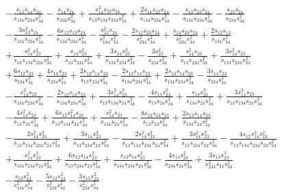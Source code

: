 \begin{align}
        & - \frac{s_{13}s_{14}s_{24}}{s_{134}s_{234}s_{34}^2} - \frac{s_{14}s_{24}}{s_{234}s_{34}^2} + \frac{s_{14}^2s_{23}s_{24}}{s_{13}s_{134}s_{234}s_{34}^2} + \frac{2s_{14}s_{23}s_{24}}{s_{134}s_{234}s_{34}^2} - \frac{s_{13}s_{23}s_{24}}{s_{134}s_{234}s_{34}^2} - \frac{s_{23}s_{24}}{s_{234}s_{34}^2} \nonumber \\
        & - \frac{3s_{13}^2s_{24}}{s_{134}s_{234}s_{34}^2} - \frac{6s_{12}s_{13}s_{24}}{s_{134}s_{234}s_{34}^2} - \frac{s_{13}^2s_{24}}{s_{134}^2s_{34}^2} - \frac{2s_{12}s_{23}s_{24}}{s_{234}^2s_{34}^2} + \frac{s_{14}s_{23}s_{24}}{s_{234}^2s_{34}^2} + \frac{2s_{12}s_{13}}{s_{134}s_{34}^2} \nonumber \\
        & + \frac{s_{14}^2s_{23}^2}{s_{13}s_{134}s_{234}s_{34}^2} + \frac{s_{14}s_{23}^2}{s_{13}s_{234}s_{34}^2} + \frac{3s_{14}s_{23}^2}{s_{134}s_{234}s_{34}^2} - \frac{3s_{23}^2}{s_{234}s_{34}^2} + \frac{s_{14}^2s_{23}}{s_{13}s_{234}s_{34}^2} + \frac{3s_{14}^2s_{23}}{s_{134}s_{234}s_{34}^2} \nonumber \\
        & + \frac{6s_{12}s_{23}}{s_{234}s_{34}^2} + \frac{4s_{13}s_{23}}{s_{234}s_{34}^2} + \frac{2s_{12}s_{14}s_{23}}{s_{13}s_{234}s_{34}^2} - \frac{2s_{12}s_{14}s_{23}}{s_{134}s_{234}s_{34}^2} + \frac{2s_{13}s_{14}s_{23}}{s_{134}s_{234}s_{34}^2} - \frac{3s_{14}s_{23}}{s_{234}s_{34}^2} \nonumber \\
        & - \frac{s_{13}^2s_{23}}{s_{134}s_{234}s_{34}^2} - \frac{2s_{12}s_{13}s_{23}}{s_{134}s_{234}s_{34}^2} + \frac{3s_{14}^2s_{23}^2}{s_{13}s_{134}s_{24}s_{34}^2} - \frac{4s_{14}s_{23}^2}{s_{13}s_{24}s_{34}^2} + \frac{s_{14}s_{23}^2}{s_{134}s_{24}s_{34}^2} + \frac{3s_{14}^3s_{23}}{s_{13}s_{134}s_{24}s_{34}^2} \nonumber \\
        & - \frac{4s_{14}^2s_{23}}{s_{13}s_{24}s_{34}^2} + \frac{6s_{12}s_{14}^2s_{23}}{s_{13}s_{134}s_{24}s_{34}^2} + \frac{s_{14}^2s_{23}}{s_{134}s_{24}s_{34}^2} - \frac{8s_{12}s_{14}s_{23}}{s_{13}s_{24}s_{34}^2} + \frac{2s_{12}s_{14}s_{23}}{s_{134}s_{24}s_{34}^2} \nonumber \\
        & - \frac{2s_{14}^2s_{23}^3}{s_{13}s_{134}s_{234}s_{24}s_{34}^2} + \frac{3s_{14}s_{23}^3}{s_{13}s_{234}s_{24}s_{34}^2} - \frac{2s_{14}^3s_{23}^2}{s_{13}s_{134}s_{234}s_{24}s_{34}^2} + \frac{3s_{14}^2s_{23}^2}{s_{13}s_{234}s_{24}s_{34}^2} - \frac{4s_{12}s_{14}^2s_{23}^2}{s_{13}s_{134}s_{234}s_{24}s_{34}^2} \nonumber \\
        & + \frac{s_{14}^2s_{23}^2}{s_{134}s_{234}s_{24}s_{34}^2} + \frac{6s_{12}s_{14}s_{23}^2}{s_{13}s_{234}s_{24}s_{34}^2} + \frac{s_{13}s_{14}s_{23}^2}{s_{134}s_{234}s_{24}s_{34}^2} - \frac{4s_{14}s_{23}^2}{s_{234}s_{24}s_{34}^2} + \frac{3s_{14}s_{23}^3}{s_{234}^2s_{24}s_{34}^2} \nonumber \\
        & - \frac{s_{12}s_{13}^2}{s_{134}^2s_{34}^2} - \frac{5s_{12}s_{23}^2}{s_{234}^2s_{34}^2} - \frac{3s_{13}s_{23}^2}{s_{234}^2s_{34}^2}
\end{align}
